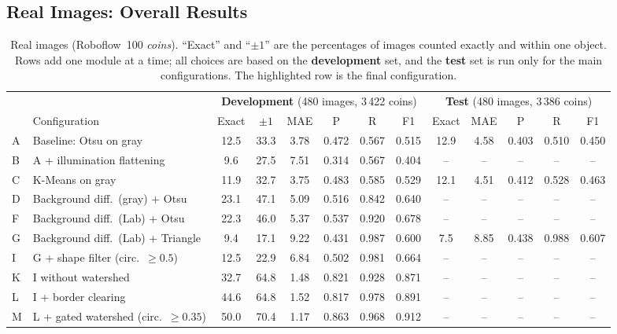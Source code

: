 \documentclass[conference,a4paper]{IEEEtran}
\begin{document}
\subsection{Real Images: Overall Results}
\begin{table}[!t]
\centering
\caption{Real images (Roboflow~100 \emph{coins}). ``Exact'' and ``$\pm1$'' are the percentages of images counted exactly and within one object. Rows add one module at a time; all choices are based on the \textbf{development} set, and the \textbf{test} set is run only for the main configurations. The highlighted row is the final configuration.}
\label{tab:real}
\footnotesize
\setlength{\tabcolsep}{3pt}
\begin{tabular}{@{}llcccccc@{\hspace{8pt}}ccccc@{}}
\toprule
& & \multicolumn{6}{c}{\textbf{Development} (480 images, 3\,422 coins)} & \multicolumn{5}{c}{\textbf{Test} (480 images, 3\,386 coins)}\\
\cmidrule(lr){3-8}\cmidrule(l){9-13}
& Configuration & Exact & $\pm1$ & MAE & P & R & F1 & Exact & MAE & P & R & F1\\
\midrule
A & Baseline: Otsu on gray & 12.5 & 33.3 & 3.78 & 0.472 & 0.567 & 0.515 & 12.9 & 4.58 & 0.403 & 0.510 & 0.450\\
B & A + illumination flattening & 9.6 & 27.5 & 7.51 & 0.314 & 0.567 & 0.404 & -- & -- & -- & -- & --\\
C & K-Means on gray & 11.9 & 32.7 & 3.75 & 0.483 & 0.585 & 0.529 & 12.1 & 4.51 & 0.412 & 0.528 & 0.463\\
D & Background diff.\ (gray) + Otsu & 23.1 & 47.1 & 5.09 & 0.516 & 0.842 & 0.640 & -- & -- & -- & -- & --\\
F & Background diff.\ (Lab) + Otsu & 22.3 & 46.0 & 5.37 & 0.537 & 0.920 & 0.678 & -- & -- & -- & -- & --\\
G & Background diff.\ (Lab) + Triangle & 9.4 & 17.1 & 9.22 & 0.431 & 0.987 & 0.600 & 7.5 & 8.85 & 0.438 & 0.988 & 0.607\\
I & G + shape filter (circ.\ $\ge0.5$) & 12.5 & 22.9 & 6.84 & 0.502 & 0.981 & 0.664 & -- & -- & -- & -- & --\\
K & I without watershed & 32.7 & 64.8 & 1.48 & 0.821 & 0.928 & 0.871 & -- & -- & -- & -- & --\\
L & I + border clearing & 44.6 & 64.8 & 1.52 & 0.817 & 0.978 & 0.891 & -- & -- & -- & -- & --\\
M & L + gated watershed (circ.\ $\ge0.35$) & 50.0 & 70.4 & 1.17 & 0.863 & 0.968 & 0.912 & -- & -- & -- & -- & --\\

\end{tabular}
\end{table}
\end{document}
